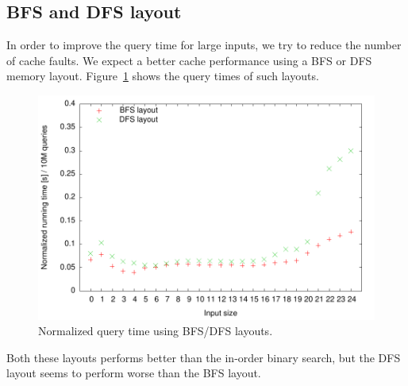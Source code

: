 \subsection{BFS and DFS layout}
In order to improve the query time for large inputs, we try to
reduce the number of cache faults. We expect a better cache
performance using a BFS or DFS memory
layout. Figure~\ref{fig:bfs_dfs_runningtime} shows the query times of
such layouts.
\begin{figure}[h!]
  \label{fig:bfs_dfs_runningtime}
  \centering
  \includegraphics[width=\textwidth]{../week1/plots/outputs/bfs_dfs_runningtime}
  \caption{Normalized query time using BFS/DFS layouts.}
\end{figure}
Both these layouts performs better than the in-order binary search,
but the DFS layout seems to perform worse than the BFS layout.

